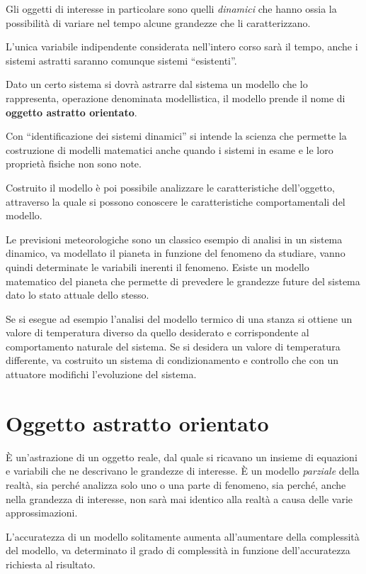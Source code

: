 Gli oggetti di interesse in particolare sono quelli \textit{dinamici}
che hanno ossia la possibilità di variare nel tempo alcune grandezze che li caratterizzano.

L'unica variabile indipendente considerata nell'intero corso sarà il tempo, anche i sistemi
astratti saranno comunque sistemi ``esistenti''.

Dato un certo sistema si dovrà astrarre dal sistema un modello che lo rappresenta,
operazione denominata modellistica, il modello prende il nome di \textbf{oggetto astratto
orientato}.

Con ``identificazione dei sistemi dinamici'' si intende la scienza che permette la costruzione di
modelli matematici anche quando i sistemi in esame e le loro proprietà fisiche non sono note.

Costruito il modello è poi possibile analizzare le caratteristiche dell'oggetto, attraverso la
quale si possono conoscere le caratteristiche comportamentali del modello.

Le previsioni meteorologiche sono un classico esempio di analisi in un sistema dinamico, va
modellato il pianeta in funzione del fenomeno da studiare, vanno quindi determinate le variabili
inerenti il fenomeno. Esiste un modello matematico del pianeta che permette di prevedere le
grandezze future del sistema dato lo stato attuale dello stesso.

Se si esegue ad esempio l'analisi del modello termico di una stanza si ottiene un valore di
temperatura diverso da quello desiderato e corrispondente al comportamento naturale del sistema.
Se si desidera un valore di temperatura differente, va costruito un sistema di condizionamento e
controllo che con un attuatore modifichi l'evoluzione del sistema.

\section{Oggetto astratto orientato}
È un'astrazione di un oggetto reale, dal quale si ricavano un insieme di equazioni e variabili che
ne descrivano le grandezze di interesse.
È un modello \textit{parziale} della realtà, sia perché analizza solo uno o una parte di fenomeno,
sia perché, anche nella grandezza di interesse, non sarà mai identico alla realtà a causa delle
varie approssimazioni.

L'accuratezza di un modello solitamente aumenta all'aumentare della complessità del modello, va
determinato il grado di complessità in funzione dell'accuratezza richiesta al risultato.

